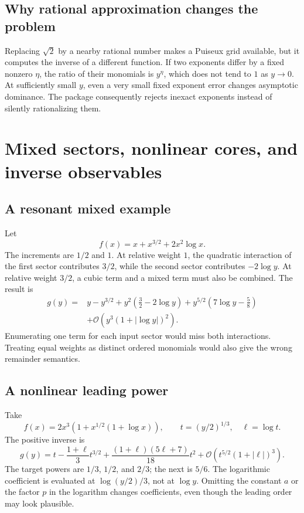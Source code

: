 \documentclass[11pt,a4paper]{article}
\numberwithin{equation}{section}
\theoremstyle{definition}\newtheorem{definition}[theorem]{Definition}
\theoremstyle{remark}\newtheorem{remark}[theorem]{Remark}
\newcommand{\OO}{\mathcal O}\newcommand{\dd}{\mathrm d}
\begin{document}
\subsection{Why rational approximation changes the problem}

Replacing $\sqrt2$ by a nearby rational number makes a Puiseux grid
available, but it computes the inverse of a different function. If two
exponents differ by a fixed nonzero $\eta$, the ratio of their monomials
is $y^\eta$, which does not tend to $1$ as $y\to0$. At sufficiently small
$y$, even a very small fixed exponent error changes asymptotic dominance.
The package consequently rejects inexact exponents instead of silently
rationalizing them.

\section{Mixed sectors, nonlinear cores, and inverse observables}
\label{sec:examples}

\subsection{A resonant mixed example}

Let
\[
 f(x)=x+x^{3/2}+2x^2\log x.
\]
The increments are $1/2$ and $1$. At relative weight $1$, the quadratic
interaction of the first sector contributes $3/2$, while the second
sector contributes $-2\log y$. At relative weight $3/2$, a cubic term
and a mixed term must also be combined. The result is
\begin{align}
 g(y)={}&y-y^{3/2}+y^2\left(\frac32-2\log y\right)
 +y^{5/2}\left(7\log y-\frac58\right)\nonumber\\
 &+\OO\!\left(y^3(1+|\log y|)^2\right).
 \label{eq:mixed}
\end{align}
Enumerating one term for each input sector would miss both interactions.
Treating equal weights as distinct ordered monomials would also give the
wrong remainder semantics.

\subsection{A nonlinear leading power}

Take
\[
 f(x)=2x^3\left(1+x^{1/2}(1+\log x)\right),\qquad
 t=(y/2)^{1/3},\quad\ell=\log t.
\]
The positive inverse is
\begin{equation}
 g(y)=t-\frac{1+\ell}{3}t^{3/2}
       +\frac{(1+\ell)(5\ell+7)}{18}t^2
       +\OO\!\left(t^{5/2}(1+|\ell|)^3\right).
 \label{eq:nonlinear-core}
\end{equation}
The target powers are $1/3$, $1/2$, and $2/3$; the next is $5/6$.
The logarithmic coefficient is evaluated at $\log(y/2)/3$, not at
$\log y$. Omitting the constant $a$ or the factor $p$ in the logarithm
changes coefficients, even though the leading order may look plausible.
\end{document}
